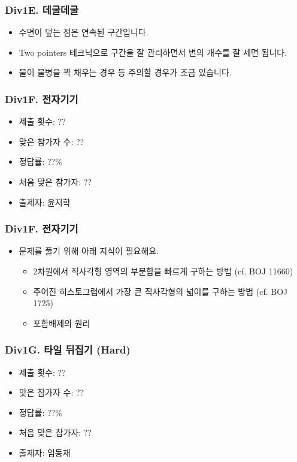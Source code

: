 \documentclass[xetex]{beamer}
\begin{document}
\begin{frame}
  \frametitle{Div1E. 데굴데굴}
  \begin{itemize}
    \item 수면이 덮는 점은 연속된 구간입니다.
    \item Two pointers 테크닉으로 구간을 잘 관리하면서 변의 개수를 잘 세면 됩니다.
    \item 물이 물병을 꽉 채우는 경우 등 주의할 경우가 조금 있습니다.
  \end{itemize}
\end{frame}

\begin{frame}
  \frametitle{Div1F. 전자기기}
  \begin{itemize}
    \item 제출 횟수: ??
    \item 맞은 참가자 수: ??
    \item 정답률: ??\%
    \item 처음 맞은 참가자: ??
    \item 출제자: 윤지학
  \end{itemize}
\end{frame}

\begin{frame}
  \frametitle{Div1F. 전자기기}
  \begin{itemize}
    \item 문제를 풀기 위해 아래 지식이 필요해요.
    \begin{itemize}
      \item 2차원에서 직사각형 영역의 부분합을 빠르게 구하는 방법 (cf. BOJ 11660)
      \item 주어진 히스토그램에서 가장 큰 직사각형의 넓이를 구하는 방법 (cf. BOJ 1725)
      \item 포함배제의 원리
    \end{itemize}
  \end{itemize}
\end{frame}

\begin{frame}
  \frametitle{Div1G. 타일 뒤집기 (Hard)}
  \begin{itemize}
    \item 제출 횟수: ??
    \item 맞은 참가자 수: ??
    \item 정답률: ??\%
    \item 처음 맞은 참가자: ??
    \item 출제자: 임동재
  \end{itemize}
\end{frame}
\end{document}
